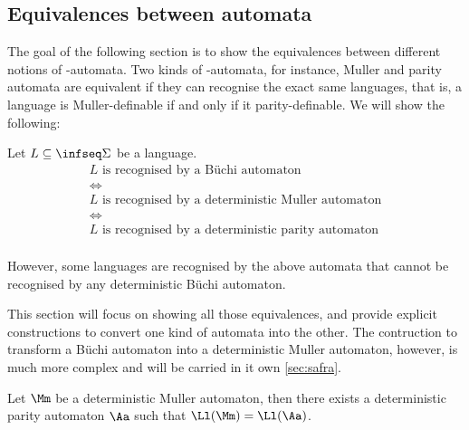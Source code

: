 \subsection{Equivalences between automata}
The goal of the following section is to show the equivalences
between different notions of \w-automata.
Two kinds of \w-automata, for instance, Muller and parity automata
are equivalent if they can recognise the exact same languages,
that is, a language is Muller-definable if and only if it parity-definable.
We will show the following:

\begin{theorem}
    \label{thm:all-automata-are-the-same}
    Let $L \subseteq \infseq\Sigma$ be a language.
    \[
        \begin{array}{c}
        L \text{ is recognised by a Büchi automaton} \\
        \iff \\
        L \text{ is recognised by a deterministic Muller automaton} \\
        \iff \\
        L \text{ is recognised by a deterministic parity automaton} \\
        \end{array}
    \]

    However, some languages are recognised by the above
    automata that cannot be recognised by any deterministic Büchi automaton.
\end{theorem}

This section will focus on showing all those equivalences,
and provide explicit constructions to convert one kind of automata
into the other.
The contruction to transform a Büchi automaton into a deterministic Muller automaton,
however, is much more complex and will be carried in
it own \autoref{sec:safra}.

\begin{lemma}
    \label{lem:muller-to-parity}
    Let $\Mm$ be a deterministic Muller automaton,
    then there exists a deterministic parity automaton $\Aa$
    such that $\Ll(\Mm) = \Ll(\Aa)$.
\end{lemma}

